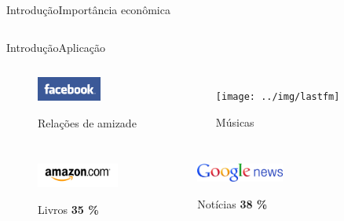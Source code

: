 \begin{frame}{Introdução}{Importância econômica}
\begin{columns}[b]
\end{columns}

\end{frame}


\begin{frame}{Introdução}{Aplicação}
\begin{columns}[c]


\begin{figure}[ht]
    \begin{center}
    \includegraphics[height=30px]{img/facebook}

    Relações de amizade
    \end{center}
\end{figure}


\begin{figure}[ht]
    \begin{center}
    \texttt{[image: ../img/lastfm]}

    Músicas
    \end{center}
\end{figure}
\end{columns}
\begin{columns}[b]


\begin{figure}[ht]
    \begin{center}
    \includegraphics[height=30px]{img/amazon}

    Livros \textbf{35 \%} \\
    \cite{amazon35}
    \end{center}
\end{figure}

\begin{figure}[ht]
    \begin{center}
    \includegraphics[height=23px]{img/google-news}

    Notícias \textbf{38 \%} \\
    \cite{das2007google}
    \end{center}
\end{figure}


\end{columns}
\end{frame}
